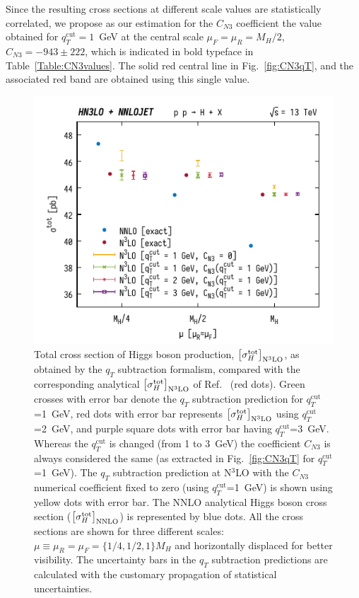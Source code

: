 \documentclass[12pt]{article}
\DeclareRobustCommand{\qt}{q_T}
\DeclareRobustCommand{\qtcut}{\ensuremath{q_T^\mathrm{cut}}}
\begin{document}
Since the resulting cross sections at different scale values are statistically correlated, we propose as our estimation for the $C_{N3}$ coefficient the value obtained for  $\qtcut=1$~GeV   at the central scale $\mu_F=\mu_R=M_{H}/2$, $C_{N3}=-943 \pm 222$, which is indicated in bold typeface in Table~\ref{Table:CN3values}.
The solid red central line in Fig.~\ref{fig:CN3qT}, and the associated red band are obtained using this single value. 

\begin{figure}
\centering
\includegraphics[width=.6\linewidth]{./new_figures/totXsecN3LO}
\caption{\label{fig:totXsecN3LO}{Total cross section of Higgs boson production, $\bigl[\sigma_{H}^{{\rm {tot}}}\bigr]_{\rm N^{3}LO}$, as obtained by the $\qt$ subtraction formalism, compared with the corresponding analytical $\bigl[\sigma_{H}^{{\rm {tot}}}\bigr]_{\rm N^{3}LO}$ of Ref.~\cite{Mistlberger:2018etf} (red dots). Green crosses with error bar denote the $\qt$ subtraction prediction for $\qtcut$=1~GeV, red dots with error bar represents  $\bigl[\sigma_{H}^{{\rm {tot}}}\bigr]_{\rm N^{3}LO}$ using $\qtcut$=2~GeV, and purple square dots with error bar having $\qtcut$=3~GeV. Whereas the $\qtcut$ is changed (from 1 to 3~GeV) the coefficient $C_{N3}$ is always considered the same (as extracted in Fig.~\ref{fig:CN3qT} for $\qtcut$=1~GeV). The $\qt$ subtraction prediction at N$^{3}$LO with the $C_{N3}$ numerical coefficient fixed to zero (using $\qtcut$=1~GeV) is shown using yellow dots with error bar. The NNLO analytical Higgs boson cross section ($\bigl[\sigma_{H}^{{\rm {tot}}}\bigr]_{\rm NNLO}$) is represented by blue dots. All the cross sections are shown for three different scales: $\mu \equiv \mu_R = \mu_F = \{1/4,1/2,1 \} M_H$ and horizontally displaced for better visibility. The uncertainty bars in the $\qt$ subtraction predictions are calculated with the customary propagation of statistical uncertainties.}}
\end{figure}
\end{document}
